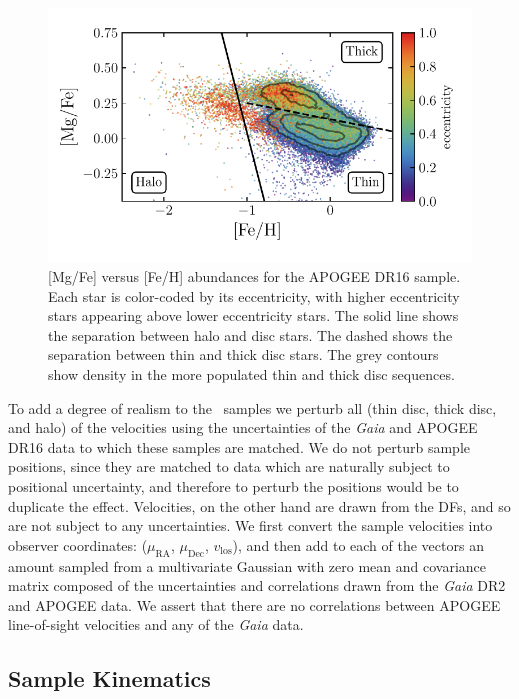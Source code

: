 \begin{figure}
	\centering
	\includegraphics[width=\columnwidth]{figure/ch2/APOGEEDR16HaloDiscALPHAFE.pdf}
	\caption{[Mg/Fe] versus [Fe/H] abundances for the APOGEE DR16 sample. Each star is color-coded by its eccentricity, with higher eccentricity stars appearing above lower eccentricity stars. The solid line shows the separation between halo and disc stars. The dashed shows the separation between thin and thick disc stars. The grey contours show density in the more populated thin and thick disc sequences.}
	\label{fig:APOGEEAbundances}
\end{figure}

To add a degree of realism to the \survey\ samples we perturb all (thin disc, thick disc, and halo) of the velocities using the uncertainties of the \textit{Gaia} and APOGEE DR16 data to which these samples are matched. We do not perturb sample positions, since they are matched to data which are naturally subject to positional uncertainty, and therefore to perturb the positions would be to duplicate the effect. Velocities, on the other hand are drawn from the DFs, and so are not subject to any uncertainties. We first convert the sample velocities into observer coordinates: ($\mu_\mathrm{RA}$, $\mu_\mathrm{Dec}$, $v_\mathrm{los}$), and then add to each of the vectors an amount sampled from a multivariate Gaussian with zero mean and covariance matrix composed of the uncertainties and correlations drawn from the \textit{Gaia} DR2 and APOGEE data. We assert that there are no correlations between APOGEE line-of-sight velocities and any of the \textit{Gaia} data.

\subsection{Sample Kinematics}
\label{subsec:SampleKinematics}

